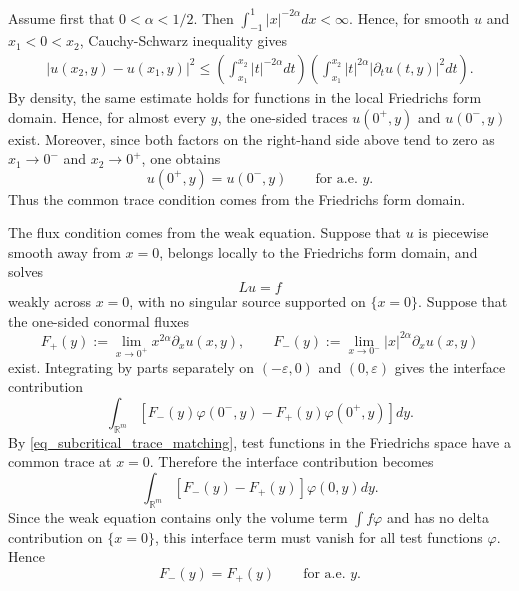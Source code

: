 \documentclass[12pt]{amsart}
\begin{document}
Assume first that $0<\alpha<1/2$. Then $\int_{-1}^{1}|x|^{-2\alpha}dx<\infty$. Hence, for smooth $u$ and $x_1 < 0 < x_2$, Cauchy-Schwarz inequality gives
\begin{align*}
|u(x_2,y)-u(x_1,y)|^2\le \left(\int_{x_1}^{x_2}|t|^{-2\alpha}dt\right) \left(\int_{x_1}^{x_2}|t|^{2\alpha}|\partial_tu(t,y)|^2 dt\right).
\end{align*}
By density, the same estimate holds for functions in the local Friedrichs form
domain. Hence, for almost every $y$, the one-sided traces $u(0^+,y)$ and
$u(0^-,y)$ exist. Moreover, since both factors on the right-hand side above tend to zero as $x_1\to0^-$ and
$x_2\to0^+$, one obtains
\begin{equation}\label{eq_subcritical_trace_matching}
    u(0^+,y)=u(0^-,y)
    \qquad
    \text{for a.e. }y.
\end{equation}
Thus the common trace condition comes from the Friedrichs form domain.

The flux condition comes from the weak equation. Suppose that $u$ is piecewise smooth away from $x=0$, belongs locally to the Friedrichs form domain, and solves
\begin{equation}\label{equation}
    Lu=f
\end{equation}
weakly across $x=0$, with no singular source supported on $\{x=0\}$. Suppose that the one-sided conormal fluxes
\begin{equation*}
    F_+(y):=\lim_{x\to0^+}x^{2\alpha}\partial_xu(x,y),
    \qquad
    F_-(y):=\lim_{x\to0^-}|x|^{2\alpha}\partial_xu(x,y)
\end{equation*}
exist. Integrating by parts separately on $(-\varepsilon,0)$ and $(0,\varepsilon)$
gives the interface contribution
\begin{equation*}
\int_{\mathbb R^m}
    \left[F_-(y)\varphi(0^-,y)-F_+(y)\varphi(0^+,y)\right] dy.    
\end{equation*}
By \eqref{eq_subcritical_trace_matching}, test functions in the Friedrichs space
have a common trace at $x=0$. Therefore the interface contribution becomes
\begin{equation*}
    \int_{\mathbb R^m}
    \left[F_-(y)-F_+(y)\right]\varphi(0,y) dy.
\end{equation*}
Since the weak equation contains only the volume term $\int f\varphi$ and has no
delta contribution on $\{x=0\}$, this interface term must vanish for all test
functions $\varphi$. Hence
\begin{equation}\label{eq_subcritical_flux_matching}
    F_-(y)=F_+(y)
    \qquad\text{for a.e. }y.
\end{equation}
\end{document}
